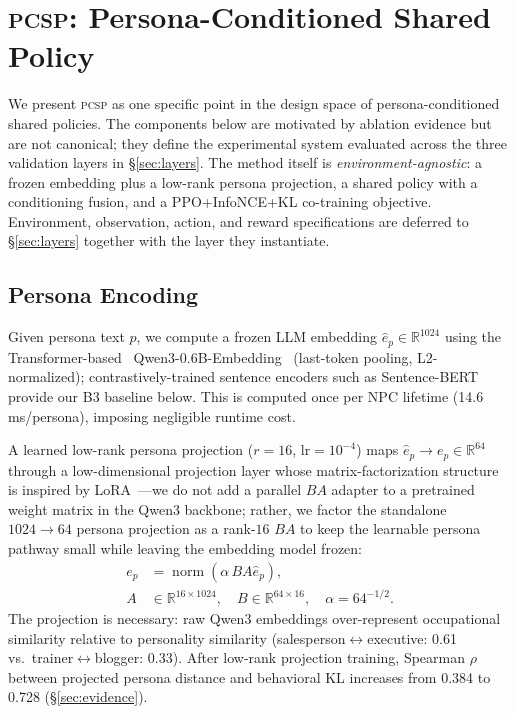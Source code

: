 \documentclass[conference]{IEEEtran}
\newcommand{\PCSP}{\textsc{pcsp}\xspace}
\begin{document}
\section{\PCSP{}: Persona-Conditioned Shared Policy}
\label{sec:method}

We present \PCSP as one specific point in the design space of persona-conditioned
shared policies. The components below are motivated by ablation evidence
but are not canonical; they define the experimental system evaluated across the
three validation layers in \S\ref{sec:layers}. The method itself is
\emph{environment-agnostic}: a frozen embedding plus a low-rank persona projection,
a shared policy with a conditioning fusion, and a PPO+InfoNCE+KL co-training
objective. Environment, observation, action, and reward specifications are
deferred to \S\ref{sec:layers} together with the layer they instantiate.

\subsection{Persona Encoding}

Given persona text $p$, we compute a frozen LLM embedding
$\hat{e}_p \in \mathbb{R}^{1024}$ using the Transformer-based~\cite{vaswani2017attention}
Qwen3-0.6B-Embedding~\cite{qwen3embed}
(last-token pooling, L2-normalized); contrastively-trained sentence encoders
such as Sentence-BERT~\cite{reimers2019sbert} provide our B3 baseline below.
This is computed once per NPC lifetime (14.6\,ms/persona), imposing negligible
runtime cost.

A learned low-rank persona projection ($r\!=\!16$,
$\text{lr}\!=\!10^{-4}$) maps $\hat{e}_p \to e_p \in \mathbb{R}^{64}$
through a low-dimensional projection layer whose matrix-factorization
structure is inspired by LoRA~\cite{hu2022lora}---we do not add a parallel
$BA$ adapter to a pretrained weight matrix in the Qwen3 backbone; rather, we
factor the standalone $1024\!\to\!64$ persona projection as a rank-$16$
$BA$ to keep the learnable persona pathway small while leaving the embedding
model frozen:
\[
\begin{aligned}
  e_p &= \operatorname{norm}\!\left(\alpha\, B A \hat{e}_p\right), \\
  A &\in \mathbb{R}^{16\times1024},\quad
  B \in \mathbb{R}^{64\times16},\quad
  \alpha = 64^{-1/2}.
\end{aligned}
\]
The projection is necessary: raw Qwen3 embeddings over-represent occupational
similarity relative to personality similarity (salesperson$\leftrightarrow$executive:
0.61 vs.\ trainer$\leftrightarrow$blogger: 0.33).
After low-rank projection training, Spearman $\rho$ between projected persona
distance and behavioral KL increases from 0.384 to 0.728
(\S\ref{sec:evidence}).
\end{document}
